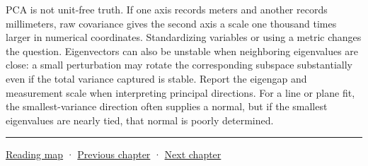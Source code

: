 PCA is not unit-free truth. If one axis records meters and another records millimeters, raw covariance gives the second axis a scale one thousand times larger in numerical coordinates. Standardizing variables or using a metric changes the question. Eigenvectors can also be unstable when neighboring eigenvalues are close: a small perturbation may rotate the corresponding subspace substantially even if the total variance captured is stable. Report the eigengap and measurement scale when interpreting principal directions. For a line or plane fit, the smallest-variance direction often supplies a normal, but if the smallest eigenvalues are nearly tied, that normal is poorly determined.

\begin{center}\rule{0.5\linewidth}{0.5pt}\end{center}

\hyperref[volume-reading-map]{Reading map} · \hyperref[02-foundations-ii-ch021-multivariable-derivatives-and-sensitivity]{Previous chapter} · \hyperref[02-foundations-ii-ch023-probability-models-and-measurement-error]{Next chapter}
